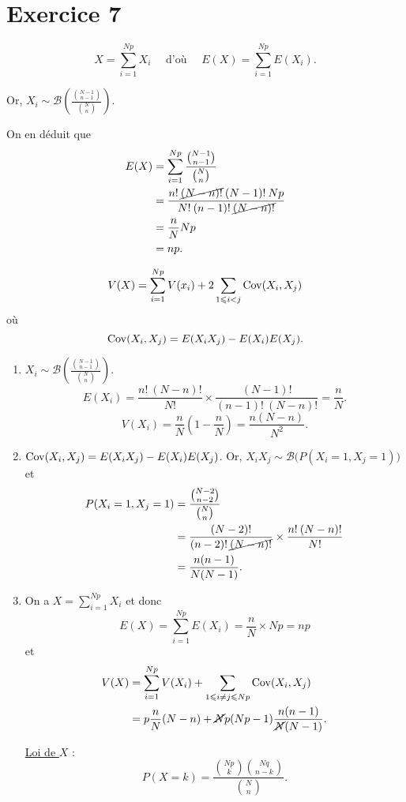 \part{Exercice 7}

\[
	X = \sum_{i=1}^{Np} X_i \quad \text{ d'où } \quad E(X) = \sum_{i=1}^{Np} E(X_i)
.\]

Or, $X_i\textstyle \sim \mathcal{B}\left( \frac{{N-1\choose n-1}}{{N\choose n}} \right)$.

On en déduit que
\begin{align*}
	E(X) &= \sum_{i=1}^{Np} \frac{{N-1\choose n-1}}{{N \choose n}}\\
	&= \frac{n!\:\cancel{(N-n)!}\:(N-1)!\:Np}{N!\:(n-1)!\:\cancel{(N-n)!}} \\
	&= \frac{n}{N}Np \\
	&= np. \\
\end{align*}

\[
	V(X) = \sum_{i=1}^{Np} V(x_i) + 2\sum_{1\leqslant i<j}\operatorname{Cov}(X_i, X_j)
\] où \[
	\operatorname{Cov}(X_i, X_j) = E(X_iX_j) - E(X_i)E(X_j)
.\]


\begin{enumerate}
	\item $X_i \sim \mathcal{B}\left( \frac{{N-1\choose n-1}}{{N\choose n}} \right)$.
		\[
			E(X_i) = \frac{n!\:(N-n)!}{N!} \times \frac{(N-1)!}{(n-1)!\:(N-n)!} = \frac{n}{N}
		.\]
		\[
			V(X_i) = \frac{n}{N}\left( 1-\frac{n}{N} \right) = \frac{n(N-n)}{N^2}
		.\]
	\item $\operatorname{Cov}(X_i, X_j) = E(X_iX_j)-E(X_i)E(X_j)$. Or, $X_iX_j \sim \mathcal{B}\big(P(X_i = 1, X_j = 1)\big)$ et
		\begin{align*}
			P(X_i = 1, X_j = 1) &= \frac{{N-2\choose n-2}}{{N \choose n}}\\
			&= \frac{(N-2)!}{(n-2)!\:\cancel{(N-n)!}} \times \frac{n!\:(N-n)!}{N!}\\
			&= \frac{n(n-1)}{N(N-1)}. \\
		\end{align*}
	\item On a $X = \sum_{i=1}^{Np}X_i$ et donc \[
			E(X) = \sum_{i=1}^{Np}E(X_i) = \frac{n}{N} \times N p = np
		\] et
		\begin{align*}
			V(X) &= \sum_{i=1}^{Np}V(X_i) + \sum_{1\leqslant i \neq j \leqslant Np} \operatorname{Cov}(X_i, X_j) \\
			&= p \frac{n}{N} (N - n) + \cancel{N}p(Np-1) \frac{n(n-1)}{\cancel{N}(N-1)}. \\
		\end{align*}

		\underline{Loi de $X$} : \[
			P(X = k) = \frac{{Np \choose k}{Nq \choose n-k}}{{N \choose n}}
		.\]
\end{enumerate}
